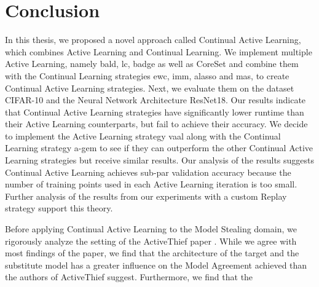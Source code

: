 
\chapter{Conclusion}
\label{ch:Conclusion}
In this thesis, we proposed a novel approach called Continual Active Learning, which combines Active Learning and Continual Learning. 
We implement multiple Active Learning, namely \gls{bald}, \gls{lc}, \gls{badge} as well as CoreSet and combine them with the Continual Learning
strategies \gls{ewc}, \gls{imm}, \gls{alasso} and \gls{mas}, to create Continual Active Learning strategies. Next, we 
evaluate them on the dataset CIFAR-10 and the Neural Network Architecture ResNet18. Our results indicate that Continual Active Learning
strategies have significantly lower runtime than their Active Learning counterparts, but fail to achieve their accuracy. We decide to implement
the Active Learning strategy \gls{vaal} along with the Continual Learning strategy \gls{a-gem} to see if they can outperform the other
Continual Active Learning strategies but receive similar results. Our analysis of the results suggests Continual
Active Learning achieves sub-par validation accuracy because the number of training points used in each Active Learning iteration is too
small. Further analysis of the results from our experiments with a custom Replay strategy support this theory. \par
Before applying Continual Active Learning to the Model Stealing domain, we rigorously analyze the setting of the ActiveThief paper
\cite{pal2020activethief}. While we agree with most findings of the paper, we find that the architecture of the target and the substitute
model has a greater influence on the Model Agreement achieved than the authors of ActiveThief suggest. Furthermore, we find that the
